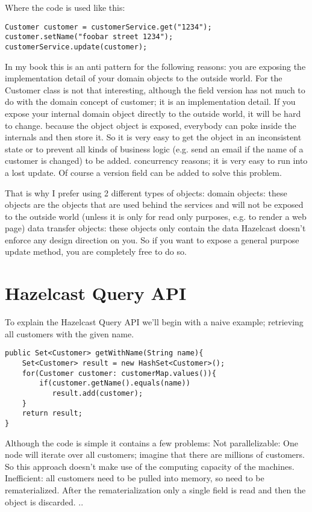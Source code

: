 Where the code is used like this:

\begin{verbatim}
Customer customer = customerService.get("1234");
customer.setName("foobar street 1234");
customerService.update(customer);
\end{verbatim}

In my book this is an anti pattern for the following reasons:
you are exposing the implementation detail of your domain objects to the outside world. For the Customer class is not that interesting, although the field version has not much to do with the domain concept of customer; it is an implementation detail.  If you expose your internal domain object directly to the outside world, it will be hard to change.
because the object object is exposed, everybody can poke inside the internals and then store it. So it is very easy to get the object in an inconsistent state or to prevent all kinds of business logic (e.g. send an email if the name of a customer is changed) to be added.
concurrency reasons; it is very easy to run into a lost update. Of course a version field can be added to solve this problem.

That is why I prefer using 2 different types of objects:
domain objects: these objects are the objects that are used behind the services and will not be exposed to the outside world (unless it is only for read only purposes, e.g. to render a web page)
data transfer objects: these objects only contain the data
Hazelcast doesn't enforce any design direction on you. So if you want to expose a general purpose update method, you are completely free to do so.

\section{Hazelcast Query API}

To explain the Hazelcast Query API we'll begin with a naive example; retrieving all customers with the given name.

\begin{verbatim}
public Set<Customer> getWithName(String name){
    Set<Customer> result = new HashSet<Customer>();
    for(Customer customer: customerMap.values()){
        if(customer.getName().equals(name))
           result.add(customer);
    }
    return result;
}
\end{verbatim}

Although the code is simple it contains a few problems:
Not parallelizable: One node will iterate over all customers; imagine that there are millions of customers. So this approach doesn't make use of the computing capacity of the machines.
Inefficient: all customers need to be pulled into memory, so need to be rematerialized. After the rematerialization only a single field is read and then the object is discarded.
..


